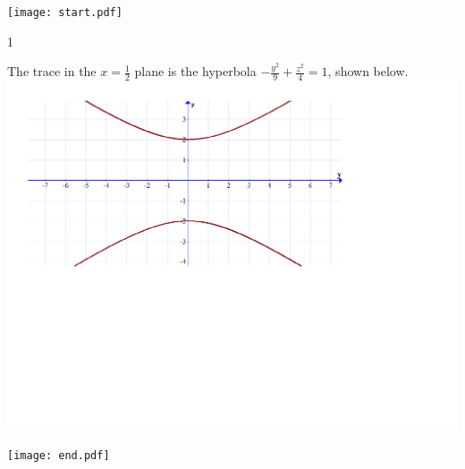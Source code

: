 \documentclass[12pt]{article}
\begin{document}
\begin{enumerate}
\texttt{[image: start.pdf]}
{{{1\linewidth}{\begin{center}The trace in the $x=\frac{1}{2}$ plane is the hyperbola $-\frac{y^2}{9}+\frac{z^2}{4}=1$, shown below.\\
\includegraphics[scale=0.5]{traces3.pdf}
\end{center}}}}
\texttt{[image: end.pdf]}


\end{enumerate}

\end{document}

